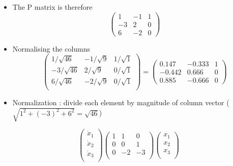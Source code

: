 \documentclass[12pt, a4paper]{report}
\theoremstyle{plain}
\theoremstyle{definition}
\theoremstyle{remark}
\begin{document}
{{\begin{itemize}
\item The P matrix is therefore
\[
\left(\begin{array}{ccc}
1 & -1 & 1 \\
-3 & 2 & 0 \\
6 & -2 & 0
\end{array} \right) \]
\end{itemize}
}




\newpage
{\Large
\begin{itemize}

\item Normalising the columns
\[
\left(\begin{array}{ccc}
1/ \sqrt{46} & -1/\sqrt{9} & 1/\sqrt{1} \\
-3/ \sqrt{46} & 2/\sqrt{9} & 0/\sqrt{1} \\
6/ \sqrt{46} & -2/\sqrt{9} & 0/\sqrt{1} \\
\end{array} \right)=
\left(\begin{array}{ccc}
0.147 & -0.333 & 1 \\
-0.442 & 0.666 & 0 \\
0.885 & -0.666 & 0
\end{array} \right) \]

\item Normalization : divide each element by magnitude of column vector ($ \sqrt{1^2 +(-3)^2 +6^2} =\sqrt{46}$)

\end{itemize}
}

\newpage
{\Large

\[ \left(
  \begin{array}{c}
    \dot{x}_1 \\
    \dot{x}_2 \\
    \dot{x}_3 \\
  \end{array}
\right)\left(
\begin{array}{ccc}
1 &1 &0\\
0 &0& 1\\
0 &-2& -3\\
 \end{array}
       \right)
        \left( \begin{array}{c}
    x_1 \\
    x_2 \\
    x_3 \\
  \end{array}
\right)\]

}}
\end{document}
